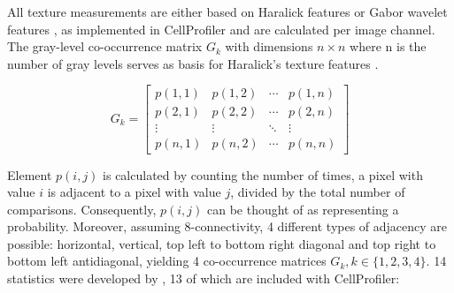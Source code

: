 All texture measurements are either based on Haralick features \citep{Haralick1973} or Gabor wavelet features \citep{Gabor1946}, as implemented in CellProfiler and are calculated per image channel. The gray-level co-occurrence matrix $G_k$ with dimensions $n \times n$ where n is the number of gray levels serves as basis for Haralick's texture features \citep{Carpenter2006}.

\begin{equation}
  G_k = \begin{bmatrix}
    p(1,1) & p(1,2) & \cdots & p(1,n) \\
    p(2,1) & p(2,2) & \cdots & p(2,n) \\
    \vdots  & \vdots  & \ddots & \vdots  \\
    p(n,1) & p(n,2) & \cdots & p(n,n) 
  \end{bmatrix}
\end{equation}

Element $p(i,j)$ is calculated by counting the number of times, a pixel with value $i$ is adjacent to a pixel with value $j$, divided by the total number of comparisons. Consequently, $p(i,j)$ can be thought of as representing a probability. Moreover, assuming 8-connectivity, 4 different types of adjacency are possible: horizontal, vertical, top left to bottom right diagonal and top right to bottom left antidiagonal, yielding 4 co-occurrence matrices $G_k, k\in\{1,2,3,4\}$. 14 statistics were developed by \citeauthor{Haralick1973}, 13 of which are included with CellProfiler:

